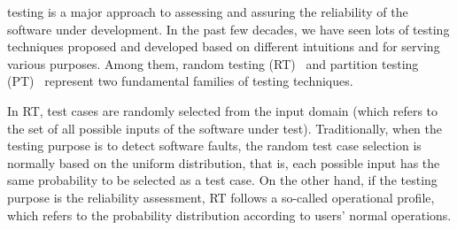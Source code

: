 \documentclass[10pt,journal,compsoc]{IEEEtran}
\begin{document}
\maketitle


\IEEEdisplaynontitleabstractindextext



%
\IEEEpeerreviewmaketitle





 testing is a major approach to assessing and assuring the reliability of the software under development. In the past few decades, we have seen lots of testing techniques proposed and developed based on different intuitions and for serving various purposes. Among them, random testing (RT)~\cite{Hamlet02} and partition testing (PT)~\cite{Weyuker91} represent two fundamental families of testing techniques.

In RT, test cases are randomly selected from the input domain (which refers to the set of all possible inputs of the software under test). Traditionally, when the testing purpose is to detect software faults, the random test case selection is normally based on the uniform distribution, that is, each possible input has the same probability to be selected as a test case. On the other hand, if the testing purpose is the reliability assessment, RT follows a so-called operational profile, which refers to the probability distribution according to users' normal operations.
\end{document}
